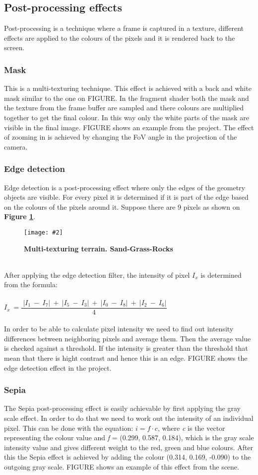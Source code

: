 \documentclass[10pt, a4paper]{article}
\newcommand{\figuremacro}[5]{
    \begin{figure}[#1]
        \centering
        \texttt{[image: \#2]}
        \caption[#3]{\textbf{#3}#4}
        \label{fig:#2}
    \end{figure}
}
\begin{document}
	\subsection{Post-processing effects}
	Post-processing is a technique where a frame is captured in a texture, different effects are applied to the colours of the pixels and it is rendered back to the screen.
	\subsubsection{Mask}
	This is a multi-texturing technique. This effect is achieved with a back and white mask similar to the one on FIGURE. In the fragment shader both the mask and the texture from the frame buffer are sampled and there colours are multiplied together to get the final colour. In this way only the white parts of the mask are visible in the final image. FIGURE shows an example from the project. The effect of zooming in is achieved by changing the FoV angle in the projection of the camera.
	\subsubsection{Edge detection}
	Edge detection is a post-processing effect where only the edges of the geometry objects are visible. For every pixel it is determined if it is part of the edge based on the colours of the pixels around it. Suppose there are 9 pixels as 
	shown on \textbf{Figure {\ref{fig:edgeDetectionMatrix}}}. 
	\figuremacro{h}{edgeDetectionMatrix}{Multi-texturing terrain. Sand-Grass-Rocks}{ }{0.8}
	\\After applying the edge detection filter, the intensity of pixel $I_{x}$ is determined from the formula: \\\\
	$I_{x}~=\dfrac{~|I_{1}~-~I_{7}|~+~|I_{5}~-~I_{3}|~+~|I_{0}~-~I_{8}|~+~|I_{2}~-~I_{6}|}{4}$~
	\\\\ In order to be able to calculate pixel intensity we need to find out intensity differences between neighboring pixels and average them. Then the average value is checked against a threshold. If the intensity is greater than the threshold that mean that there is hight contrast and hence this is an edge. FIGURE shows the edge detection effect in the project.
	\subsubsection{Sepia}
	The Sepia post-processing effect is easily achievable by first applying the gray scale effect. In order to do that we need to work out the intensity of an individual pixel. This can be done with the equation: $i = f \cdot c$, where \textit{c} is the vector representing the colour value and \textit{f} = (0.299, 0.587, 0.184), which is the gray scale intensity value and gives different weight to the red, green and blue colours. After this the Sepia effect is achieved by adding the colour (0.314, 0.169, -0.090) to the outgoing gray scale. FIGURE shows an example of this effect from the scene.
\end{document}
